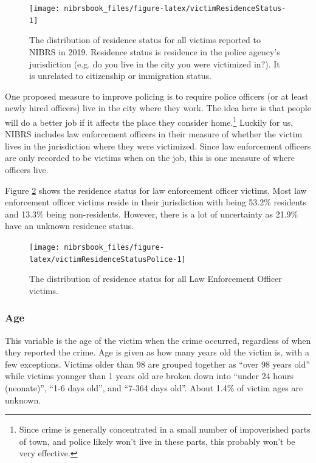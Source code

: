 \documentclass[
  12pt,
  openany]{book}
\begin{document}
\begin{figure}

{\centering \texttt{[image: nibrsbook\_files/figure-latex/victimResidenceStatus-1]} 

}

\caption{The distribution of residence status for all victims reported to NIBRS in 2019. Residence status is residence in the police agency's jurisdiction (e.g. do you live in the city you were victimized in?). It is unrelated to citizenship or immigration status.}\label{fig:victimResidenceStatus}
\end{figure}

One proposed measure to improve policing is to require police officers (or at least newly hired officers) live in the city where they work. The idea here is that people will do a better job if it affects the place they consider home.\footnote{Since crime is generally concentrated in a small number of impoverished parts of town, and police likely won't live in these parts, this probably won't be very effective.} Luckily for us, NIBRS includes law enforcement officers in their measure of whether the victim lives in the jurisdiction where they were victimized. Since law enforcement officers are only recorded to be victims when on the job, this is one measure of where officers live.

Figure \ref{fig:victimResidenceStatusPolice} shows the residence status for law enforcement officer victims. Most law enforcement officer victims reside in their jurisdiction with being 53.2\% residents and 13.3\% being non-residents. However, there is a lot of uncertainty as 21.9\% have an unknown residence status.

\begin{figure}

{\centering \texttt{[image: nibrsbook\_files/figure-latex/victimResidenceStatusPolice-1]} 

}

\caption{The distribution of residence status for all Law Enforcement Officer victims.}\label{fig:victimResidenceStatusPolice}
\end{figure}

\hypertarget{age-1}{%
\subsubsection{Age}\label{age-1}}

This variable is the age of the victim when the crime occurred, regardless of when they reported the crime. Age is given as how many years old the victim is, with a few exceptions. Victims older than 98 are grouped together as ``over 98 years old'' while victims younger than 1 years old are broken down into ``under 24 hours (neonate)'', ``1-6 days old'', and ``7-364 days old''. About 1.4\% of victim ages are unknown.
\end{document}
